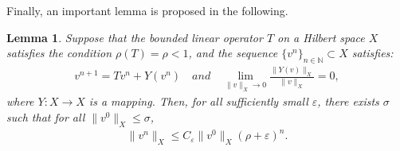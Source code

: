 \documentclass[preprint,3p]{elsarticle}
\newtheorem{lemma}{Lemma}[section]
\begin{document}
Finally, an important lemma is proposed in the following.
\begin{lemma}\label{Nonlinear-Iteration}
	Suppose that the {bounded} linear operator $T$ on a Hilbert space $X$ satisfies the condition $\rho(T)=\rho<1$, and the sequence $\big\{v^n\big\}_{n\in\mathbb{N}}\subset X$ satisfies:
	\begin{align*}
		v^{n+1}=Tv^n+Y(v^n)\quad and \quad \lim\limits_{\|v\|_{X}\to0}\frac{\|Y(v)\|_{X}}{\|v\|_{X}}=0,
	\end{align*}
	{where $Y:X\to X$ is a mapping.}
	Then, for all sufficiently small $\varepsilon$, there exists $\sigma$ such that for all $\|v^0\|_X\le\sigma$, 
	\begin{align*}
		\|v^n\|_{X}\le C_{\varepsilon}\|v^0\|_X(\rho+\varepsilon)^n.
	\end{align*}
\end{lemma}
\end{document}
